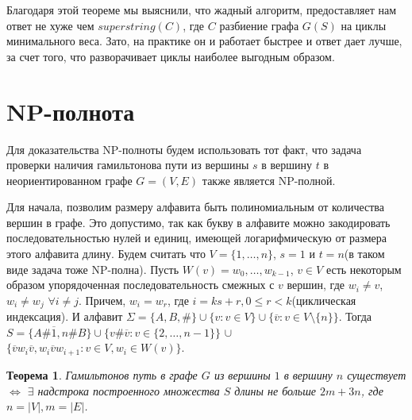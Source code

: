 \documentclass[a4paper,10pt]{article}
\newtheorem{theorem}{Теорема}
\begin{document}
Благодаря этой теореме мы выяснили, что жадный алгоритм, предоставляет нам ответ не хуже чем $superstring(C)$, 
где $C$ разбиение графа $G(S)$ на циклы минимального веса.
Зато, на практике он и работает быстрее и ответ дает лучше, за счет того, что разворачивает циклы наиболее выгодным образом.

\section{NP-полнота}

Для доказательства NP-полноты будем использовать тот факт, что задача проверки наличия гамильтонова пути из вершины $s$ в вершину $t$ в неориентированном графе $G = (V, E)$
также является NP-полной.

Для начала, позволим размеру алфавита быть полиномиальным от количества вершин в графе.
Это допустимо, так как букву в алфавите можно закодировать последовательностью нулей и единиц, имеющей логарифмическую от размера этого алфавита длину.
Будем считать что $V = \{1, \dots, n\}$, $s = 1$ и $t = n$(в таком виде задача тоже NP-полна).
Пусть $W(v) = w_0, \dots, w_{k-1}$, $v \in V$ есть некоторым образом упорядоченная последовательность смежных с $v$ вершин, где $w_i \ne v$, $w_i \ne w_j$ $\forall i \ne j$.
Причем, $w_i = w_r$, где $i = ks + r, 0 \leq r < k$(циклическая индексация).
И алфавит $\Sigma = \{A, B, \#\} \cup \{v: v \in V\} \cup \{\overline{v}: v \in V \setminus \{n\}\}$.
Тогда $S = \{A \# \overline{1}, n \# B\} \cup \{v \# \overline{v}: v \in \{ 2, \dots, n-1 \}\}$ $\cup$ 
$\{ \overline{v} w_i \overline{v}, w_i \overline{v} w_{i+1}: v \in V, w_i \in W(v)\}$.

\begin{theorem}
Гамильтонов путь в графе $G$ из вершины $1$ в вершину $n$ существует $\iff$ $\exists$ надстрока построенного множества $S$ длины не больше $2m + 3n$,
где $n = |V|, m = |E|$.
\end{theorem}
\end{document}
